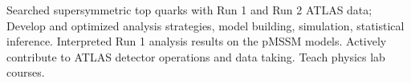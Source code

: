 \begin{cventries}
\end{cventries}
        Searched supersymmetric top quarks with Run 1 and Run 2 ATLAS data; Develop and optimized analysis strategies, model building, simulation, statistical inference. \newline 
        Interpreted Run 1 analysis results on the pMSSM models. \newline
        Actively contribute to ATLAS detector operations and data taking. \newline
        Teach physics lab courses. \newline
